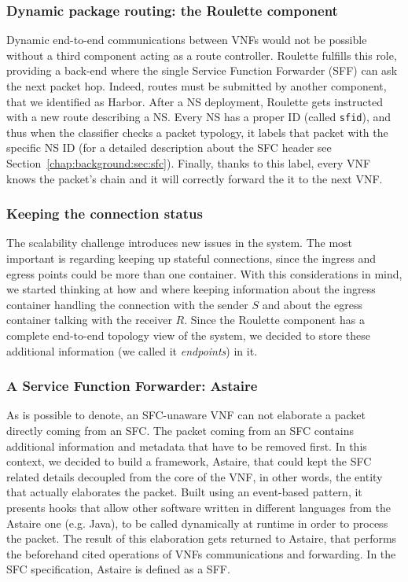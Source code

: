 \subsubsection{Dynamic package routing: the Roulette component}
\label{chap:prjan:sec:tech:sub:SFC:sub:roulette}
Dynamic end-to-end communications between VNFs would not be possible without a
third component acting as a route controller. Roulette fulfills this role,
providing a back-end where the single Service Function Forwarder (SFF) can ask
the next packet hop. Indeed, routes must be submitted by another component, that
we identified as Harbor. After a NS deployment, Roulette gets instructed with a
new route describing a NS. Every NS has a proper ID (called \verb!sfid!), and
thus when the classifier checks a packet typology, it labels that packet with
the specific NS ID (for a detailed description about the SFC header see
Section~\ref{chap:background:sec:sfc}). Finally, thanks to this label, every VNF
knows the packet's chain and it will correctly forward the it to the next VNF.

\subsubsection{Keeping the connection status}
The scalability challenge introduces new issues in the system. The most
important is regarding keeping up stateful connections, since the ingress and
egress points could be more than one container. With this considerations in
mind, we started thinking at how and where keeping information about the ingress
container handling the connection with the sender $S$ and about the egress
container talking with the receiver $R$. Since the Roulette component has a
complete end-to-end topology view of the system, we decided to store these
additional information (we called it \emph{endpoints}) in it.

\subsubsection{A Service Function Forwarder: Astaire}
As is possible to denote, an SFC-unaware VNF can not elaborate a packet directly
coming from an SFC. The packet coming from an SFC contains additional
information and metadata that have to be removed first. In this context, we
decided to build a framework, Astaire, that could kept the SFC related details
decoupled from the core of the VNF, in other words, the entity that actually
elaborates the packet. Built using an event-based pattern, it presents hooks
that allow other software written in different languages from the Astaire one
(e.g. Java), to be called dynamically at runtime in order to process the packet.
The result of this elaboration gets returned to Astaire, that performs the
beforehand cited operations of VNFs communications and forwarding. In the SFC
specification, Astaire is defined as a SFF.

